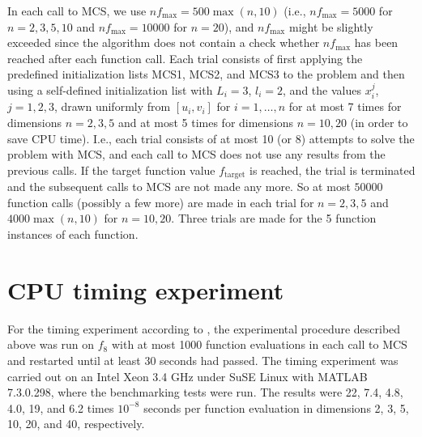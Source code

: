 \documentclass{sig-alternate}
\begin{document}
In each call to MCS, we use $nf_{\max} = 500\max(n,10)$ (i.e., $nf_{\max} = 5000$
for $n=2, 3, 5, 10$ and $nf_{\max} = 10000$ for $n=20$),
and $nf_{\max}$ might be slightly exceeded since the
algorithm does not contain a check whether $nf_{\max}$ has been reached after each
function call. Each trial consists of first applying the predefined initialization
lists MCS1, MCS2, and MCS3 to the problem and then using a self-defined 
initialization list with $L_i = 3$, $l_i = 2$, and the values $x_i^j$, $j=1,2,3$, 
drawn uniformly from $[u_i,v_i]$ for $i=1,\dots,n$ for at most 7 times for 
dimensions $n=2,3,5$ and at most 5 times for dimensions $n=10,20$ (in order to save
CPU time). I.e., each trial consists of at most 10 (or 8) attempts to solve the
problem with MCS, and each call to MCS does not use any results from the previous
calls. If the target function value $f_\text{target}$ is reached, the trial is
terminated and the subsequent calls to MCS are not made any more. So at most
$50000$ function calls (possibly a few more) are made in each trial for $n=2,3,5$
and $4000\max(n,10)$ for $n=10,20$.
Three trials are made for the 5 function instances of each function. 

\section{CPU timing experiment}

For the timing experiment according to \cite{hansen2009exp},
the experimental procedure described above was run on $f_8$
with at most 1000 function evaluations in each call to MCS and restarted until 
at least 30 seconds had passed. The timing experiment was carried out on an Intel
Xeon 3.4 GHz under SuSE Linux with MATLAB 7.3.0.298, where the
benchmarking tests were run. The results were
22, 7.4, 4.8, 4.0, 19, and 6.2 times $10^{-8}$ seconds per function evaluation
in dimensions 2, 3, 5, 10, 20, and 40, respectively.


\end{document}
